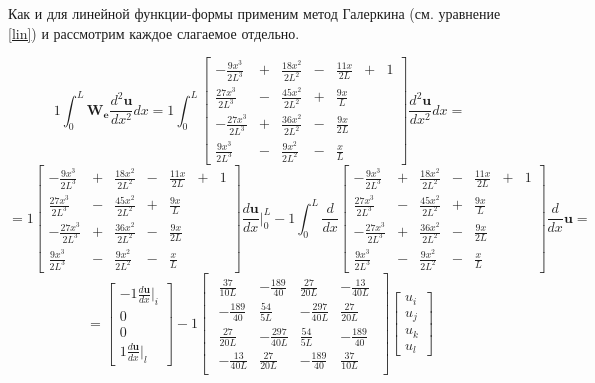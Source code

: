 Как и для линейной функции-формы применим метод Галеркина (см. уравнение \ref{lin}) и рассмотрим каждое слагаемое отдельно.

$$1 \int_0^L \mathbf{W_e} \frac{d^2 \mathbf{u}}{dx^2} dx
=
1\int_0^L
\begin{bmatrix}
	-\frac{9x^3}{2L^3}&+&\frac{18x^2}{2L^2}&-&\frac{11x}{2L} &+& 1\\
	\frac{27x^3}{2L^3}&-&\frac{45x^2}{2L^2}&+&\frac{9x}{L}&&\\
	-\frac{27x^3}{2L^3}&+&\frac{36x^2}{2L^2}&-&\frac{9x}{2L}&&\\
	\frac{9x^3}{2L^3}&-&\frac{9x^2}{2L^2}&-&\frac{x}{L}&&
\end{bmatrix}
\frac{d^2 \mathbf{u}}{dx^2} dx
=
$$
$$
=
1
\begin{bmatrix}
	-\frac{9x^3}{2L^3}&+&\frac{18x^2}{2L^2}&-&\frac{11x}{2L} &+& 1\\
	\frac{27x^3}{2L^3}&-&\frac{45x^2}{2L^2}&+&\frac{9x}{L}&&\\
	-\frac{27x^3}{2L^3}&+&\frac{36x^2}{2L^2}&-&\frac{9x}{2L}&&\\
	\frac{9x^3}{2L^3}&-&\frac{9x^2}{2L^2}&-&\frac{x}{L}&&
\end{bmatrix}
\frac{d\mathbf{u}}{dx} |_0^L
  -1  \int_0^L \frac{d}{dx}
\begin{bmatrix}
	-\frac{9x^3}{2L^3}&+&\frac{18x^2}{2L^2}&-&\frac{11x}{2L} &+& 1\\
	\frac{27x^3}{2L^3}&-&\frac{45x^2}{2L^2}&+&\frac{9x}{L}&&\\
	-\frac{27x^3}{2L^3}&+&\frac{36x^2}{2L^2}&-&\frac{9x}{2L}&&\\
	\frac{9x^3}{2L^3}&-&\frac{9x^2}{2L^2}&-&\frac{x}{L}&&
\end{bmatrix}
\frac{d}{dx} \mathbf{u}
=$$
$$
=
\begin{bmatrix}
	  -1 \frac{d\mathbf{u}}{dx}|_i \\
	0\\
	0\\
1\frac{d\mathbf{u}}{dx}|_l
\end{bmatrix}
  -1 
\begin{bmatrix}
\begin{array}{rrrr}
	\frac{37}{10L} & -\frac{189}{40} & \frac{27}{20L} & -\frac{13}{40L}\\
	-\frac{189}{40} & \frac{54}{5L} & -\frac{297}{40L} & \frac{27}{20L}\\
	\frac{27}{20L} &  -\frac{297}{40L} & \frac{54}{5L} & -\frac{189}{40}\\
	-\frac{13}{40L} & \frac{27}{20L} & -\frac{189}{40} & \frac{37}{10L}
\end{array}
\end{bmatrix}
\begin{bmatrix}
u_i \\
u_j \\
u_k\\
u_l
\end{bmatrix}
$$

